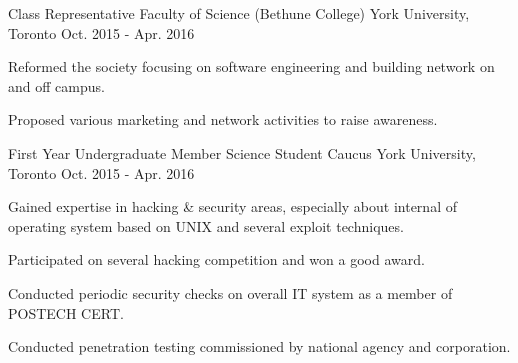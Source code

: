 \begin{cventries}

  \cventry
    {Class Representative} %
    {Faculty of Science (Bethune College)} %
    {York University, Toronto} %
    {Oct. 2015 - Apr. 2016} %
    {
      \begin{cvitems} %
        \item {Reformed the society focusing on software engineering and building network on and off campus.}
        \item {Proposed various marketing and network activities to raise awareness.}
      \end{cvitems}
    }

  \cventry
    {First Year Undergraduate Member} %
    {Science Student Caucus} %
    {York University, Toronto} %
    {Oct. 2015 - Apr. 2016} %
    {
      \begin{cvitems} %
        \item {Gained expertise in hacking \& security areas, especially about internal of operating system based on UNIX and several exploit techniques.}
        \item {Participated on several hacking competition and won a good award.}
        \item {Conducted periodic security checks on overall IT system as a member of POSTECH CERT.}
        \item {Conducted penetration testing commissioned by national agency and corporation.}
      \end{cvitems}
    }


\end{cventries}
